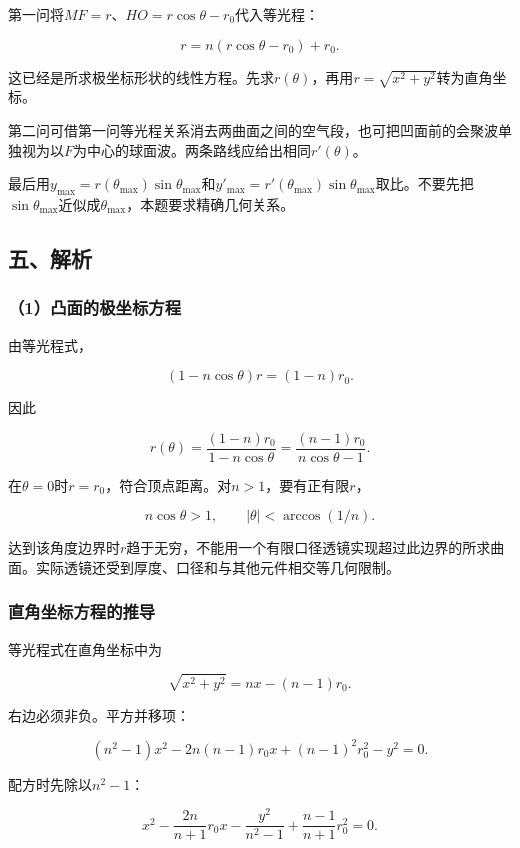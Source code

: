 \documentclass[12pt,a4paper,fontset=fandol]{ctexart}
\begin{document}
第一问将\(MF=r\)、\(HO=r\cos\theta-r_0\)代入等光程：

\[
r=n(r\cos\theta-r_0)+r_0.
\]

这已经是所求极坐标形状的线性方程。先求\(r(\theta)\)，再用\(r=\sqrt{x^2+y^2}\)转为直角坐标。

第二问可借第一问等光程关系消去两曲面之间的空气段，也可把凹面前的会聚波单独视为以\(F\)为中心的球面波。两条路线应给出相同\(r'(\theta)\)。

最后用\(y_{\max}=r(\theta_{\max})\sin\theta_{\max}\)和\(y'_{\max}=r'(\theta_{\max})\sin\theta_{\max}\)取比。不要先把\(\sin\theta_{\max}\)近似成\(\theta_{\max}\)，本题要求精确几何关系。

\subsection{五、解析}\label{ux4e94ux89e3ux6790}

\subsubsection{（1）凸面的极坐标方程}\label{ux51f8ux9762ux7684ux6781ux5750ux6807ux65b9ux7a0b}

由等光程式，

\[
(1-n\cos\theta)r=(1-n)r_0.
\]

因此

\[
\boxed{
r(\theta)=\frac{(1-n)r_0}{1-n\cos\theta}
=\frac{(n-1)r_0}{n\cos\theta-1}}.
\]

在\(\theta=0\)时\(r=r_0\)，符合顶点距离。对\(n>1\)，要有正有限\(r\)，

\[
n\cos\theta>1,\qquad
|\theta|<\arccos(1/n).
\]

达到该角度边界时\(r\)趋于无穷，不能用一个有限口径透镜实现超过此边界的所求曲面。实际透镜还受到厚度、口径和与其他元件相交等几何限制。

\subsubsection{直角坐标方程的推导}\label{ux76f4ux89d2ux5750ux6807ux65b9ux7a0bux7684ux63a8ux5bfc}

等光程式在直角坐标中为

\[
\sqrt{x^2+y^2}=nx-(n-1)r_0.
\]

右边必须非负。平方并移项：

\[
(n^2-1)x^2-2n(n-1)r_0x
+(n-1)^2r_0^2-y^2=0.
\]

配方时先除以\(n^2-1\)：

\[
x^2-\frac{2n}{n+1}r_0x
-\frac{y^2}{n^2-1}
+\frac{n-1}{n+1}r_0^2=0.
\]
\end{document}

